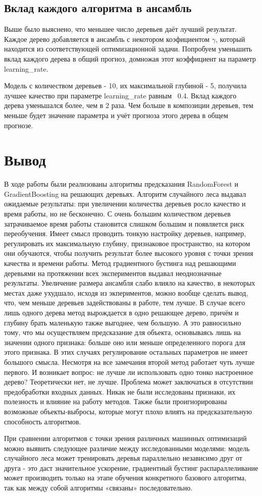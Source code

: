 \documentclass[a4paper,14pt]{article}
\begin{document}
\subsection{Вклад каждого алгоритма в ансамбль}
Выше было выяснено, что меньшее число деревьев даёт лучший результат. Каждое дерево добавляется в ансамбль с некотором коэфициентом $\gamma$, который находится из соответствующей оптимизационной задачи. Попробуем уменьшить вклад каждого дерева в общий прогноз, домножая этот коэффициент на параметр learning\_rate.


Модель с количеством деревьев - 10, их максимальной глубиной - 5, получила лучшее качество при параметре learning\_rate равным ~0.4. Вклад каждого дерева уменьшался более, чем в 2 раза. Чем больше в композиции деревьев, тем меньше будет значение параметра и учёт прогноза этого дерева в общем прогнозе.

\section{Вывод}
В ходе работы были реализованы алгоритмы предсказания RandomForest и GradientBoosting на решающих деревьях. Алгоритм случайного леса выдавал ожидаемые результаты: при увеличении количества деревьев росло качество и время работы, но не бесконечно. С очень большим количеством деревьев затрачиваемое время работы становится слишком большим и появляется риск переобучения. Имеет смысл проводить тонкую настройку деревьев, например, регулировать их максимальную глубину, признаковое пространство, на котором они обучаются, чтобы получить результат более высокого уровня с точки зрения качества и времени работы. Метод градиентного бустинга над решающими деревьями на протяжении всех экспериментов выдавал неоднозначные результаты. Увеличение размера ансамбля слабо влияло на качество, в некоторых местах даже ухудшало, исходя из экпериментов, можно вообще сделать вывод, что, чем меньше деревьев задействованы в работе, тем лучше. В случае всего лишь одного дерева метод вырождается в одно решающее дерево, причём и глубину брать маленькую также выгоднее, чем большую. А это равносильно тому, что мы осуществляем предсказание для объекта, основываясь лишь на значении одного признака: больше оно или меньше определенного порога для этого признака. В этих случаях регулирование остальных параметров не имеет большого смысла. Несмотря на все замечания второй метод работает чуть лучше первого. И возникает вопрос: не лучше ли использовать одно тонко настроенное дерево? Теоретически нет, не лучше. Проблема может заключаться в отсутствии предобработки входных данных. Никак не были исследованы признаки, их полезность и влияние на работу методов. Также были проигнорированы возможные объекты-выбросы, которые могут плохо влиять на предсказательную способность алгоритмов.

При сравнении алгоритмов с точки зрения различных машинных оптимизаций можно выявить следующее различие между исследованными моделями: модель случайного леса может тренировать деревья параллельно независимо друг от друга - это даст значительное ускорение, градиентный бустинг распараллеливание может производить только на этапе обучения конкретного базового алгоритма, так как между собой алгоритмы «связаны» последовательно.
\end{document}

